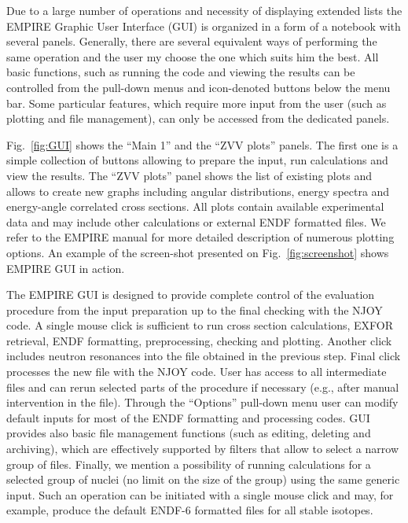 Due to a large number of operations and necessity of displaying extended
lists the EMPIRE Graphic User Interface (GUI) is organized in a form of a
notebook with several panels. Generally, there are several equivalent ways
of performing the same operation and the user my choose the one which suits
him the best. All basic functions, such as running the code and viewing the
results can be controlled from the pull-down menus and icon-denoted buttons
below the menu bar. Some particular features, which require more input from
the user (such as plotting and file management), can only be accessed from
the dedicated panels.

Fig.~\ref{fig:GUI} shows the ``Main 1'' and the ``ZVV plots'' panels. The
first one is a simple collection of buttons allowing to prepare the input,
run calculations and view the results. The ``ZVV plots'' panel shows the
list of existing plots and allows to create new graphs including angular
distributions, energy spectra and energy-angle correlated cross sections.
All plots contain available experimental data and may include other
calculations or external ENDF formatted files. We refer to the EMPIRE manual
for more detailed description of numerous plotting options. An example of
the screen-shot presented on Fig.~\ref{fig:screenshot} shows EMPIRE GUI in
action.

\begin{figure*}[htbp]
\caption{Screen-shot of the EMPIRE GUI with a generated plot of cross
sections for the inelastic scattering to the first 4 levels in $^{89}$Y.
Note the capability of the interface to multiply results by a power of 10 to
separate the curves.}
\label{fig:screenshot}
\end{figure*}

The EMPIRE GUI is designed to provide complete control of the evaluation
procedure from the input preparation up to the final checking with the NJOY
code. A single mouse click is sufficient to run cross section calculations,
EXFOR retrieval, ENDF formatting, preprocessing, checking and plotting.
Another click includes neutron resonances into the file obtained in the
previous step. Final click processes the new file with the NJOY code. User
has access to all intermediate files and can rerun selected parts of the
procedure if necessary (e.g., after manual intervention in the file).
Through the ``Options'' pull-down menu user can modify default inputs for
most of the ENDF formatting and processing codes. GUI provides also basic
file management functions (such as editing, deleting and archiving), which
are effectively supported by filters that allow to select a narrow group of
files. Finally, we mention a possibility of running calculations for a
selected group of nuclei (no limit on the size of the group) using the same
generic input. Such an operation can be initiated with a
single mouse click and may, for example, produce the default
ENDF-6 formatted files for all stable isotopes.

